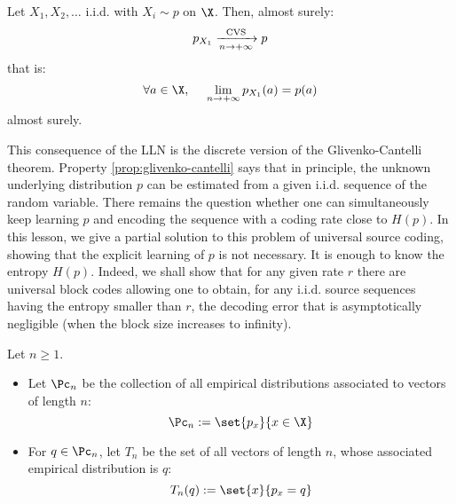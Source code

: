 \documentclass[toc]{../cs-classes/cs-classes}
\begin{document}
\begin{property}
    \label{prop:glivenko-cantelli}
    Let $X_1, X_2, \dots$ i.i.d. with $X_i\sim p$ on $\X$. Then, almost surely:
    \begin{equation*}
        p_{X_1} \xrightarrow[n\to+\infty]{\textnormal{CVS}} p
    \end{equation*}
    that is:
    \begin{equation*}
        \forall a\in\X, \quad \lim_{n\to+\infty}p_{X_1}(a)=p(a)
    \end{equation*}
    almost surely.
\end{property}

\begin{remark}
    This consequence of the LLN is the discrete version of the Glivenko-Cantelli theorem. Property \ref{prop:glivenko-cantelli} says that in principle, the unknown underlying distribution $p$ can be estimated from a given i.i.d. sequence of the random variable. There remains the question whether one can simultaneously keep learning $p$ and encoding the sequence with a coding rate close to $H(p)$. In this lesson, we give a partial solution to this problem of universal source coding, showing that the explicit learning of $p$ is not necessary. It is enough to know the entropy $H(p)$. Indeed, we shall show that for any given rate $r$ there are universal block codes allowing one to obtain, for any i.i.d. source sequences having the entropy smaller than $r$, the decoding error that is asymptotically negligible (when the block size increases to infinity).
\end{remark}

\begin{definition}
    Let $n\geq1$.
    \begin{itemize}
        \item Let $\Pc_n$ be the collection of all empirical distributions associated to vectors of length $n$:
        \begin{equation*}
            \Pc_n := \set{p_x}{x\in\X}
        \end{equation*}
        \item For $q\in\Pc_n$, let $T_n$ be the set of all vectors of length $n$, whose associated empirical distribution is $q$:
        \begin{equation*}
            T_n(q) := \set{x}{p_x=q}
        \end{equation*}
    \end{itemize}
\end{definition}
\end{document}
